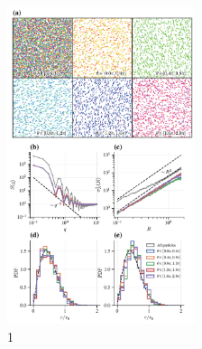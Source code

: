 \documentclass{article}
\begin{document}
\begin{figure}
    \centering
    \includegraphics[width=0.49\textwidth]{./figs/hyperuniform.pdf}
    \caption{
        \label{fig:hyperuniform}
        1
    }
\end{figure}




\end{document}
